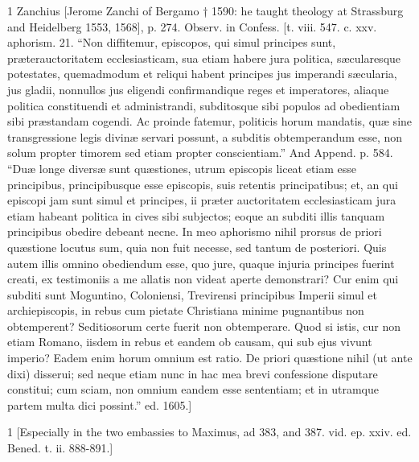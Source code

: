 1
Zanchius [Jerome Zanchi of Bergamo † 1590: he taught theology at Strassburg and Heidelberg 1553, 1568], p. 274. Observ. in Confess. [t. viii. 547. c. xxv. aphorism. 21. “Non diffitemur, episcopos, qui simul principes sunt, præterauctoritatem ecclesiasticam, sua etiam habere jura politica, sæcularesque potestates, quemadmodum et reliqui habent principes jus imperandi sæcularia, jus gladii, nonnullos jus eligendi confirmandique reges et imperatores, aliaque politica constituendi et administrandi, subditosque sibi populos ad obedientiam sibi præstandam cogendi. Ac proinde fatemur, politicis horum mandatis, quæ sine transgressione legis divinæ servari possunt, a subditis obtemperandum esse, non solum propter timorem sed etiam propter conscientiam.” And Append. p. 584. “Duæ longe diversæ sunt quæstiones, utrum episcopis liceat etiam esse principibus, principibusque esse episcopis, suis retentis principatibus; et, an qui episcopi jam sunt simul et principes, ii præter auctoritatem ecclesiasticam jura etiam habeant politica in cives sibi subjectos; eoque an subditi illis tanquam principibus obedire debeant necne. In meo aphorismo nihil prorsus de priori quæstione locutus sum, quia non fuit necesse, sed tantum de posteriori. Quis autem illis omnino obediendum esse, quo jure, quaque injuria principes fuerint creati, ex testimoniis a me allatis non videat aperte demonstrari? Cur enim qui subditi sunt Moguntino, Coloniensi, Trevirensi principibus Imperii simul et archiepiscopis, in rebus cum pietate Christiana minime pugnantibus non obtemperent? Seditiosorum certe fuerit non obtemperare. Quod si istis, cur non etiam Romano, iisdem in rebus et eandem ob causam, qui sub ejus vivunt imperio? Eadem enim horum omnium est ratio. De priori quæstione nihil (ut ante dixi) disserui; sed neque etiam nunc in hac mea brevi confessione disputare constitui; cum sciam, non omnium eandem esse sententiam; et in utramque partem multa dici possint.” ed. 1605.]

1
[Especially in the two embassies to Maximus, ad 383, and 387. vid. ep. xxiv. ed. Bened. t. ii. 888-891.]

